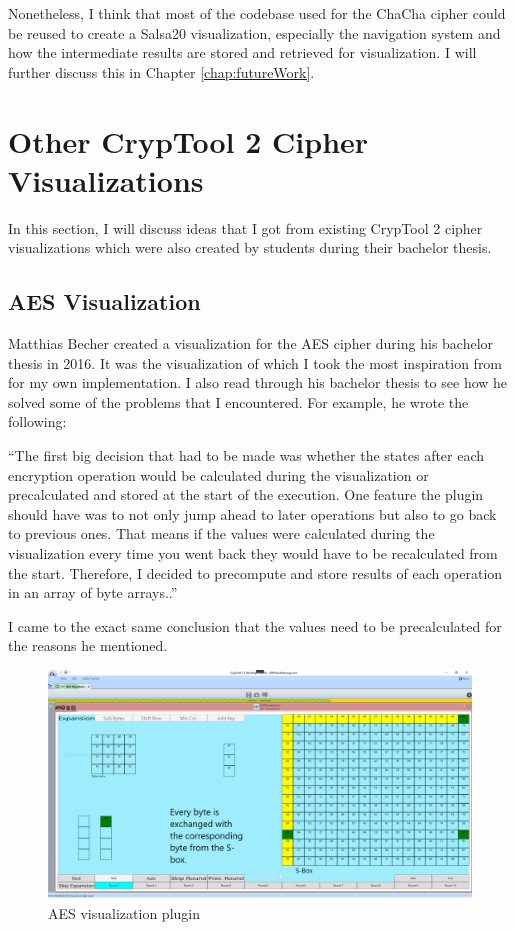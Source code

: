 Nonetheless, I think that most of the codebase used for the ChaCha cipher could be reused to create a Salsa20 visualization, especially the navigation system and how the intermediate results are stored and retrieved for visualization. I will further discuss this in Chapter \ref{chap:futureWork}.


\section{Other CrypTool 2 Cipher Visualizations}
\label{sec:otherCT2CipherVisualizations}

In this section, I will discuss ideas that I got from existing CrypTool 2 cipher visualizations which were also created by students during their bachelor thesis.

\subsection{AES Visualization}
\label{sec:aesVisualization}

Matthias Becher created a visualization for the AES cipher during his bachelor thesis in 2016. It was the visualization of which I took the most inspiration from for my own implementation. I also read through his bachelor thesis to see how he solved some of the problems that I encountered. For example, he wrote the following:

``The first big decision that had to be made was whether the states after each encryption operation would be calculated during the visualization or precalculated and stored at the start of the execution. One feature the plugin should have was to not only jump ahead to later operations but also to go back to previous ones. That means if the values were calculated during the visualization every time you went back they would have to be recalculated from the start. Therefore, I decided to precompute and store results of each operation in an array of byte arrays..'' \cite{aesthesis}

I came to the exact same conclusion that the values need to be precalculated for the reasons he mentioned.

\begin{figure}
\centering
\includegraphics[width=\textwidth]{figures/ct2/aes.png}
\caption{AES visualization plugin}
\label{fig:aes}
\end{figure}

